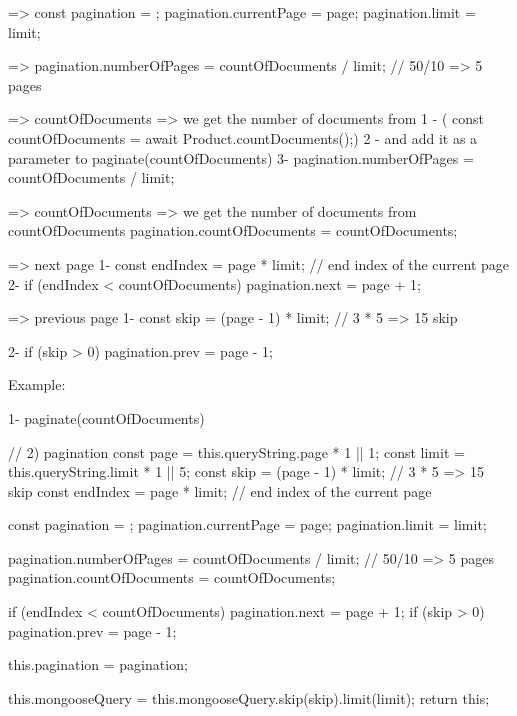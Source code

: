         =>      const pagination = {};
                pagination.currentPage = page;
                pagination.limit = limit;

        =>        pagination.numberOfPages = countOfDocuments / limit; // 50/10 => 5 pages

        =>         countOfDocuments => we get the number of documents from  
                       1 - ( const countOfDocuments = await Product.countDocuments();)
                       2 - and add it as a parameter to paginate(countOfDocuments) {}
                       3- pagination.numberOfPages = countOfDocuments / limit; 

         =>           countOfDocuments => we get the number of documents from countOfDocuments 
                            pagination.countOfDocuments = countOfDocuments;

        => next page       
                        1- const endIndex = page * limit; // end index of the current page
                        2- if (endIndex < countOfDocuments) {
                             pagination.next = page + 1;
                        }
        
        => previous page 
                        1-    const skip = (page - 1) * limit; // 3 * 5 => 15 skip

                        2-  if (skip > 0) {
                                pagination.prev = page - 1;
                            }


          Example: 

                1-
                    paginate(countOfDocuments) {
                        // 2) pagination
                        const page = this.queryString.page * 1 || 1;
                        const limit = this.queryString.limit * 1 || 5;
                        const skip = (page - 1) * limit; // 3 * 5 => 15 skip
                        const endIndex = page * limit; // end index of the current page

                        const pagination = {};
                        pagination.currentPage = page;
                        pagination.limit = limit;

                        pagination.numberOfPages = countOfDocuments / limit; // 50/10 => 5 pages
                        pagination.countOfDocuments = countOfDocuments;

                        if (endIndex < countOfDocuments) {
                        pagination.next = page + 1;
                        }
                        if (skip > 0) {
                        pagination.prev = page - 1;
                        }

                        this.pagination = pagination;

                        this.mongooseQuery = this.mongooseQuery.skip(skip).limit(limit);
                        return this;
                    }    

